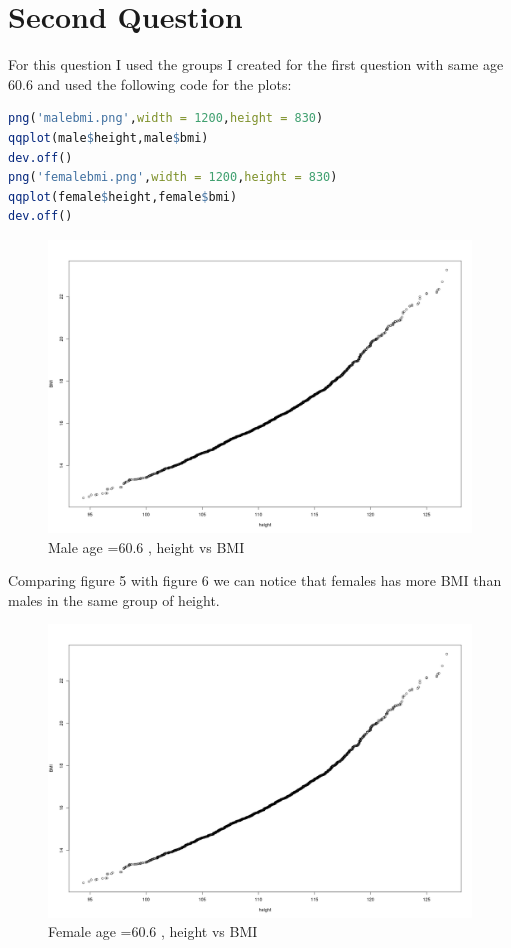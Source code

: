 \documentclass{article}
\begin{document}
	\section*{Second Question}
For this question I used the groups I created for the first question with same age 60.6 and used the following code for the plots:
\begin{lstlisting}[language=R]
png('malebmi.png',width = 1200,height = 830)
qqplot(male$height,male$bmi)
dev.off()
png('femalebmi.png',width = 1200,height = 830)
qqplot(female$height,female$bmi)
dev.off()
\end{lstlisting}
\begin{figure}[H]
\includegraphics[scale=0.4]{malebmi.png}
\caption{Male age =60.6 , height vs BMI}
\end{figure}
Comparing figure 5 with figure 6 we can notice that females has more BMI than males in the same group of height.
\begin{figure}[H]
	\includegraphics[scale=0.4]{malebmi.png}
	\caption{Female age =60.6 , height vs BMI}
\end{figure}
\end{document}
